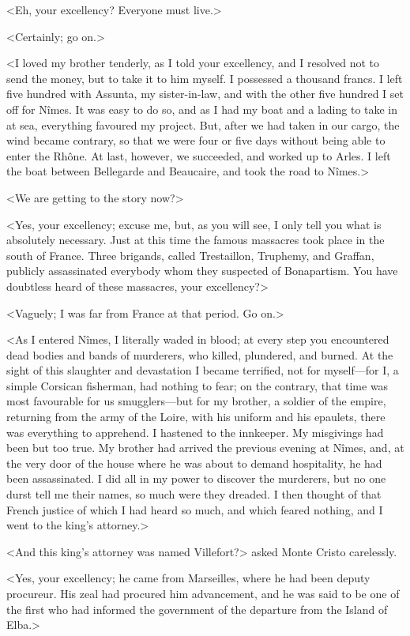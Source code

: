 <Eh, your excellency? Everyone must live.> 

 <Certainly; go on.> 

 <I loved my brother tenderly, as I told your excellency, and I resolved not to send the money, but to take it to him myself. I possessed a thousand francs. I left five hundred with Assunta, my sister-in-law, and with the other five hundred I set off for Nîmes. It was easy to do so, and as I had my boat and a lading to take in at sea, everything favoured my project. But, after we had taken in our cargo, the wind became contrary, so that we were four or five days without being able to enter the Rhône. At last, however, we succeeded, and worked up to Arles. I left the boat between Bellegarde and Beaucaire, and took the road to Nîmes.> 

 <We are getting to the story now?> 

 <Yes, your excellency; excuse me, but, as you will see, I only tell you what is absolutely necessary. Just at this time the famous massacres took place in the south of France. Three brigands, called Trestaillon, Truphemy, and Graffan, publicly assassinated everybody whom they suspected of Bonapartism. You have doubtless heard of these massacres, your excellency?> 

 <Vaguely; I was far from France at that period. Go on.> 

 <As I entered Nîmes, I literally waded in blood; at every step you encountered dead bodies and bands of murderers, who killed, plundered, and burned. At the sight of this slaughter and devastation I became terrified, not for myself—for I, a simple Corsican fisherman, had nothing to fear; on the contrary, that time was most favourable for us smugglers—but for my brother, a soldier of the empire, returning from the army of the Loire, with his uniform and his epaulets, there was everything to apprehend. I hastened to the innkeeper. My misgivings had been but too true. My brother had arrived the previous evening at Nîmes, and, at the very door of the house where he was about to demand hospitality, he had been assassinated. I did all in my power to discover the murderers, but no one durst tell me their names, so much were they dreaded. I then thought of that French justice of which I had heard so much, and which feared nothing, and I went to the king's attorney.> 

 <And this king's attorney was named Villefort?> asked Monte Cristo carelessly. 

 <Yes, your excellency; he came from Marseilles, where he had been deputy procureur. His zeal had procured him advancement, and he was said to be one of the first who had informed the government of the departure from the Island of Elba.> 

